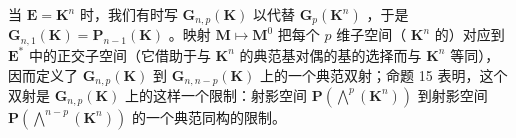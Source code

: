 当 \(\mathbf{E} = \mathbf{K}^n\) 时，我们有时写 \(\mathbf{G}_{n,p}(\mathbf{K})\) 以代替 \(\mathbf{G}_p(\mathbf{K}^n)\) ，于是 \(\mathbf{G}_{n,1}(\mathbf{K}) = \mathbf{P}_{n-1}(\mathbf{K})\) 。映射 \(\mathbf{M} \mapsto \mathbf{M}^0\) 把每个 \(p\) 维子空间（ \(\mathbf{K}^n\) 的）对应到 \(\mathbf{E}^*\) 中的正交子空间（它借助于与 \(\mathbf{K}^n\) 的典范基对偶的基的选择而与 \(\mathbf{K}^n\) 等同），因而定义了 \(\mathbf{G}_{n,p}(\mathbf{K})\) 到 \(\mathbf{G}_{n,n-p}(\mathbf{K})\) 上的一个典范双射；命题 15 表明，这个双射是 \(\mathbf{G}_{n,p}(\mathbf{K})\) 上的这样一个限制：射影空间 \(\mathbf{P}(\bigwedge^p (\mathbf{K}^n))\) 到射影空间 \(\mathbf{P}(\bigwedge^{n-p}(\mathbf{K}^n))\) 的一个典范同构的限制。

